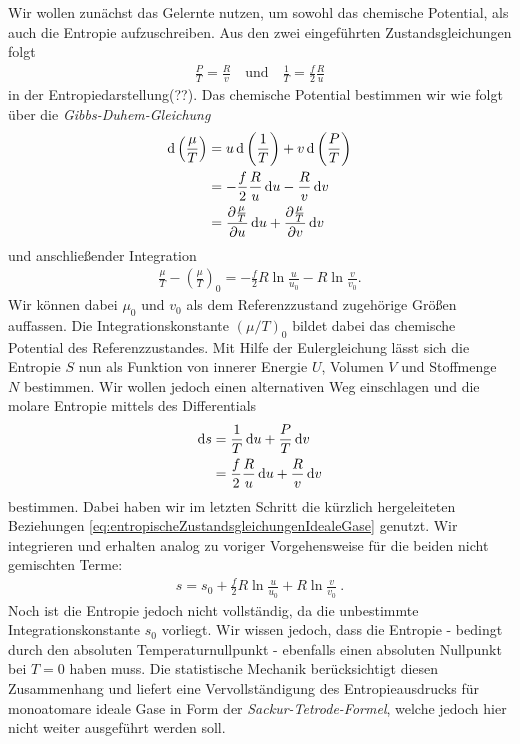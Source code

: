 Wir wollen zunächst das Gelernte nutzen, um sowohl das chemische Potential, als auch die Entropie aufzuschreiben. Aus den zwei eingeführten Zustandsgleichungen folgt 
\begin{align}
    \label{eq:entropischeZustandsgleichungenIdealeGase}
    \boxed{\frac{P}{T}=\frac{R}{v} \quad\text{und}\quad \frac{1}{T}=\frac{f}{2}\frac{R}{u}}
\end{align} 
in der Entropiedarstellung(??).
Das chemische Potential bestimmen wir wie folgt über die \emph{Gibbs-Duhem-Gleichung} 
\begin{align*}
    \mathop{}\!\mathrm{d} \left(\frac{\mu}{T}\right)&=u\mathop{}\!\mathrm{d}\left(\frac{1}{T}\right)+v\mathop{}\!\mathrm{d} \left(\frac{P}{T}\right)\\
    &=-\frac{f}{2}\frac{R}{u}\mathop{}\!\mathrm{d} u-\frac{R}{v}\mathop{}\!\mathrm{d} v\\
    &=\frac{\partial \frac{\mu}{T}}{\partial u}\mathop{}\!\mathrm{d} u+\frac{\partial \frac{\mu}{T}}{\partial v}\mathop{}\!\mathrm{d} v
\end{align*}  
und anschließender Integration 
\begin{align*}
    \frac{\mu}{T}-\left(\frac{\mu}{T}\right)_0=-\frac{f}{2}R\ln\frac{u}{u_0}-R\ln\frac{v}{v_0}.
\end{align*}
Wir können dabei $\mu_0$ und $v_0$ als dem Referenzzustand zugehörige Größen auffassen.
Die Integrationskonstante $(\mu/T)_0$ bildet dabei das chemische Potential des Referenzzustandes.
Mit Hilfe der Eulergleichung lässt sich die Entropie $S$ nun als Funktion von innerer Energie $U$, Volumen $V$ und Stoffmenge $N$ bestimmen. Wir wollen jedoch einen alternativen Weg einschlagen und die molare Entropie mittels des Differentials 
\begin{align*}
    \mathop{}\!\mathrm{d} s&=\frac{1}{T}\mathop{}\!\mathrm{d} u+\frac{P}{T}\mathop{}\!\mathrm{d} v\\
    &=\frac{f}{2}\frac{R}{u}\mathop{}\!\mathrm{d} u+\frac{R}{v}\mathop{}\!\mathrm{d} v    
\end{align*} 
bestimmen.
Dabei haben wir im letzten Schritt die kürzlich hergeleiteten Beziehungen \eqref{eq:entropischeZustandsgleichungenIdealeGase} genutzt.
Wir integrieren und erhalten analog zu voriger Vorgehensweise für die beiden nicht gemischten Terme: 
\begin{align}
    \label{eq:EntropieEinkomponentigesIdealesGas}
    \boxed{s=s_0+\frac{f}{2}R\ln\frac{u}{u_0}+R\ln\frac{v}{v_0}}\:.
\end{align}
Noch ist die Entropie jedoch nicht vollständig, da die unbestimmte Integrationskonstante $s_0$ vorliegt. Wir wissen jedoch, dass die Entropie - bedingt durch den absoluten Temperaturnullpunkt - ebenfalls einen absoluten Nullpunkt bei $T=0$ haben muss. 
Die statistische Mechanik berücksichtigt diesen Zusammenhang und liefert eine Vervollständigung des Entropieausdrucks für monoatomare ideale Gase in Form der \emph{Sackur-Tetrode-Formel}, welche jedoch hier nicht weiter ausgeführt werden soll.

